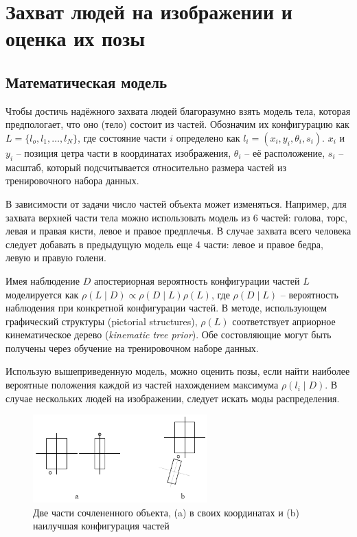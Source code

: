 \section{Захват людей на изображении и оценка их позы}

\subsection{Математическая модель}

Чтобы достичь надёжного захвата людей благоразумно взять модель тела, которая предпологает, что оно (тело) состоит из частей. Обозначим их конфигурацию как \(L = \{l_o, l_1, \dots, l_N\}\), где состояние части \(i\) определено как \(l_i = (x_i, y_i, \theta_i, s_i)\). \(x_i\) и \(y_i\) -- позиция цетра части в координатах изображения, \(\theta_i\) -- её расположение, \(s_i\) -- масштаб, который подсчитывается относительно размера частей из тренировочного набора данных.

В зависимости от задачи число частей объекта может изменяться. Например, для захвата верхней части тела можно использовать модель из 6 частей: голова, торс, левая и правая кисти, левое и правое предплечья. В случае захвата всего человека следует добавать в предыдущую модель еще 4 части: левое и правое бедра, левую и правую голени.

Имея наблюдение \(D\) апостериорная вероятность конфигурации частей \(L\) моделируется как \(\rho(L{\mid}D)\propto\rho(D{\mid}L)\rho(L)\), где \(\rho(D{\mid}L)\) -- вероятность наблюдения при конкретной конфигурации частей. В методе, использующем графический структуры (pictorial structures), \(\rho(L)\) соответствует априорное кинематическое дерево (\emph{kinematic tree prior}). Обе состовляющие могут быть получены через обучение на тренировочном наборе данных.

Использую вышеприведенную модель, можно оценить позы, если найти наиболее вероятные положения каждой из частей нахождением максимума \(\rho(l_i{\mid}D)\). В случае нескольких людей на изображении, следует искать моды распределения.

\begin{figure}
  \centering
  \includegraphics[width=0.6\textwidth]{images/detection-two-parts.png}
  \caption{Две части сочлененного объекта, (a) в своих координатах и (b) наилучшая конфигурация частей\label{detection-two-parts}}
\end{figure}

